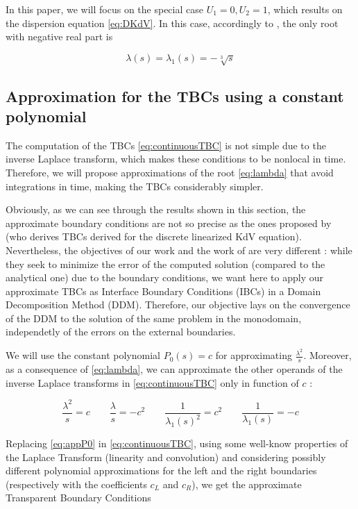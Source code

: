 \indent In this paper, we will focus on the special case $U_1 = 0, U_2 = 1$, which results on the dispersion equation \eqref{eq:DKdV}. In this case, accordingly to \cite{zheng2008}, the only root with negative real part is 

\begin{equation}
	\label{eq:lambda}
			\lambda(s) = \lambda_1(s) =  -\sqrt[3]{s} 
\end{equation}

\subsection{Approximation for the TBCs using a constant polynomial}

\indent The computation of the TBCs \eqref{eq:continuousTBC} is not simple due to the inverse Laplace transform, which makes these conditions to be nonlocal in time. Therefore, we will propose approximations of the root \eqref{eq:lambda} that avoid integrations in time, making the TBCs considerably simpler.

\indent Obviously, as we can see through the results shown in this section, the approximate boundary conditions are not so precise as the ones proposed by \cite{besse2015} (who derives TBCs derived for the discrete linearized KdV equation). Nevertheless, the objectives of our work and the work of \cite{besse2015} are very different : while they seek to minimize the error of the computed solution (compared to the analytical one) due to the boundary conditions, we want here to apply our approximate TBCs as Interface Boundary Conditions (IBCs) in a Domain Decomposition Method (DDM). Therefore, our objective lays on the convergence of the DDM to the solution of the same problem in the monodomain, independetly of the errors on the external boundaries. 

\indent We will use the constant polynomial $P_0(s) = c$ for approximating $\frac{\lambda^2}{s}$. Moreover, as a consequence of \eqref{eq:lambda}, we can approximate the other operands of the inverse Laplace transforms in \eqref{eq:continuousTBC} only in function of $c$ :

\begin{equation}
	\label{eq:appP0}
	\frac{\lambda^2}{s}  = c \qquad
	\frac{\lambda}{s}  = -c^2 \qquad
	\frac{1}{\lambda_1(s)^2}  = c^2\qquad 
	 \frac{1}{\lambda_1(s)}  = -c 
\end{equation}

\indent Replacing \eqref{eq:appP0} in \eqref{eq:continuousTBC}, using some well-know properties of the Laplace Transform (linearity and convolution) and considering possibly different polynomial approximations for the left and the right boundaries (respectively with the coefficients $c_L$ and $c_R$), we get the approximate Transparent Boundary Conditions

